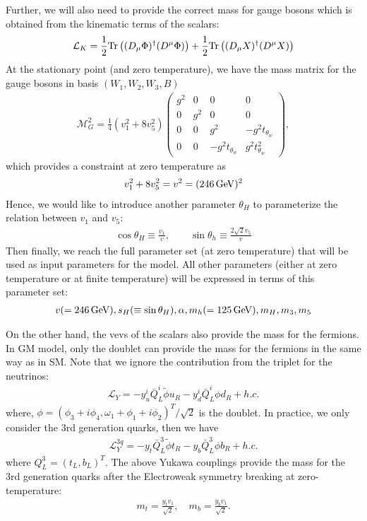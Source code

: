 \documentclass[12pt]{article}
\begin{document}
Further, we will also need to provide the correct mass for gauge bosons which is obtained from the kinematic terms of the scalars:
\begin{align}
\mathcal{L}_K = \frac{1}{2}{\rm Tr}\left((D_\mu\Phi)^\dagger(D^\mu\Phi)\right) + \frac{1}{2}{\rm Tr}\left((D_\mu X)^\dagger (D^\mu X)\right)
\end{align}
At the stationary point (and zero temperature), we have the mass matrix for the gauge bosons in basis $(W_1,W_2,W_3,B)$
\begin{align}
    \mathcal{M}_G^2 = \frac{1}{4}(v_1^2+8v_5^2)\begin{pmatrix}
        g^2 & 0 & 0 & 0 \\
        0 & g^2 & 0 & 0 \\
        0 & 0 & g^2 & -g^2t_{\theta_w} \\
        0 & 0 & -g^2t_{\theta_w} & g^2t_{\theta_w}^2
    \end{pmatrix},
\end{align}
which provides a constraint at zero temperature as
\begin{align}
    v_1^2 + 8v_5^2 = v^2 = (246\,{\rm GeV})^2
\end{align}
Hence, we would like to introduce another parameter $\theta_H$ to parameterize the relation between $v_1$ and $v_5$:
\begin{align}
    \cos\theta_H \equiv \frac{v_1}{v},\qquad  \sin\theta_h \equiv \frac{2\sqrt{2}v_5}{v}
\end{align}
Then finally, we reach the full parameter set (at zero temperature) that will be used as input parameters for the model. All other parameters (either at zero temperature or at finite temperature) will be expressed in terms of this parameter set:
\begin{align}
    v(=246\,{\rm GeV}), s_H(\equiv \sin\theta_H), \alpha, m_h(=125\,{\rm GeV}), m_H, m_3, m_5
\end{align}

On the other hand, the vevs of the scalars also provide the mass for the fermions. In GM model, only the doublet can provide the mass for the fermions in the same way as in SM. Note that we ignore the contribution from the triplet for the neutrinos:
\begin{align}
    \mathcal{L}_Y = -y_u^i \bar{Q}_L^i\tilde{\phi}u_R - y_d^i \bar{Q}_L^i\phi d_R + h.c.
\end{align}
where, $\phi = (\phi_3+i\phi_4, \omega_1+\phi_1+i\phi_2)^T/\sqrt{2}$ is the doublet. In practice, we only consider the 3rd generation quarks, then we have
\begin{align}
    \mathcal{L}_Y^{3q} = -y_t \bar{Q}_L^3\tilde{\phi}t_R - y_b \bar{Q}_L^3 \phi b_R +h.c.
\end{align}
where $Q_L^3 = (t_L, b_L)^T$. The above Yukawa couplings provide the mass for the 3rd generation quarks after the Electroweak symmetry breaking at zero-temperature:
\begin{align}
    m_t = \frac{y_tv_1}{\sqrt{2}},\quad m_b = \frac{y_bv_1}{\sqrt{2}}.
\end{align}







\end{document}
